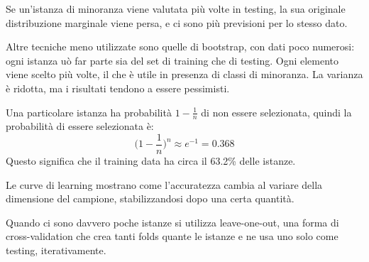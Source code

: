 Se un'istanza di minoranza viene valutata più volte in testing, la sua originale distribuzione marginale viene persa, e ci sono più previsioni per lo stesso dato.

Altre tecniche meno utilizzate sono quelle di bootstrap, con dati poco numerosi: ogni istanza uò far parte sia del set di training che di testing. Ogni elemento viene scelto più volte, il che è utile in presenza di classi di minoranza. La varianza è ridotta, ma i risultati tendono a essere pessimisti.

Una particolare istanza ha probabilità $1 - \frac{1}{n}$ di non essere selezionata, quindi la probabilità di essere selezionata è:
$$\Big(1 - \frac{1}{n}\Big)^n \approx e^{-1} = 0.368$$
Questo significa che il training data ha circa il 63.2\% delle istanze.

Le curve di learning mostrano come l'accuratezza cambia al variare della dimensione del campione, stabilizzandosi dopo una certa quantità. 

Quando ci sono davvero poche istanze si utilizza leave-one-out, una forma di cross-validation che crea tanti folds quante le istanze e ne usa uno solo come testing, iterativamente.









